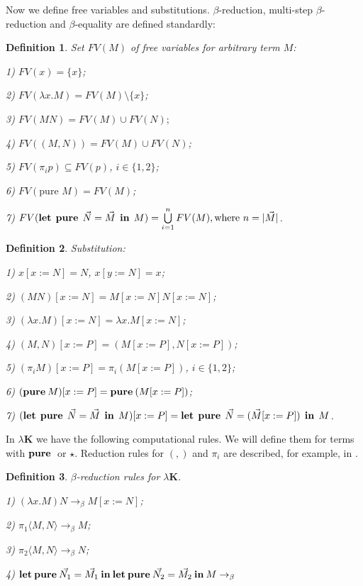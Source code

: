 \documentclass[a4paper]{article}
\newtheorem{defin}{Definition}
\begin{document}
  \vspace{\baselineskip}

  Now we define free variables and substitutions. $\beta$-reduction, multi-step $\beta$-reduction and $\beta$-equality are defined standardly:

  \begin{defin} Set $FV(M)$ of free variables for arbitrary term $M$:

  1) $FV(x) = \{ x \}$;

  2) $FV(\lambda x. M) = FV(M) \setminus \{ x\}$;

  3) $FV(M N) = FV(M) \cup FV(N);$

  4) $FV((M,N)) = FV(M) \cup FV(N)$;

  5) $FV(\pi_i p) \subseteq FV(p)$, $i \in \{ 1, 2\}$;

  6) $FV(\text{pure } M) = FV(M)$;

  7) $FV({\bf let \:\: pure} \:\: \vec{N} = \vec{M} \:\: {\bf in} \:\: M) = \bigcup \limits_{i = 1}^n FV(M), \text{where $n = |\vec{M}|$}$.
  \end{defin}

  \begin{defin} Substitution:

  1) $x [x := N] = N$, $x [y := N] = x$;

  2) $(M N) [x := N] = M[x := N] N [x := N]$;

  3) $(\lambda x. M) [x := N] = \lambda x. M [x := N]$;

  4) $(M, N)[x := P] = (M[x := P], N [x := P])$;

  5) $(\pi_i M) [x := P] = \pi_i (M[x := P])$, $i \in \{ 1, 2\}$;

  6) $({\bf pure \: } M) [x := P] = {\bf pure \: } (M [x := P])$;

  7) $({\bf let \:\: pure} \:\: \vec{N} = \vec{M} \:\: {\bf in} \:\: M) [x := P] = {\bf let \:\: pure} \:\: \vec{N} = (\vec{M} [x := P]) \:\: {\bf in} \:\: M$.
  \end{defin}

  In $\lambda \textbf{K}$ we have the following computational rules. We will define them for terms with
  ${\bf pure \: }$ or $\star$. Reduction rules for $(,)$ and $\pi_i$ are described, for example, in
  \cite{Pierce}.

  \begin{defin} $\beta$-reduction rules for \emph{$\lambda \textbf{K}$}.

  1) $(\lambda x. M) N \rightarrow_{\beta} M [x := N]$;

  2) $\pi_1 \langle M, N \rangle \rightarrow_{\beta} M$;

  3) $\pi_2 \langle M, N \rangle \rightarrow_{\beta} N$;

  4) ${\bf let \: pure \: } \vec{N_1} = \vec{M_1} \: {\bf in} \: {\bf let \: pure \:} \vec{N_2} = \vec{M_2} \: {\bf in} \: M \rightarrow_{\beta} $

  \end{defin}
\end{document}
